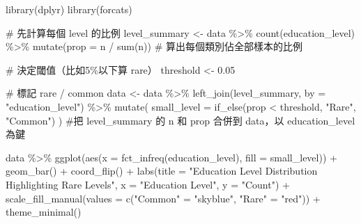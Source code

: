 \documentclass[
  letterpaper,
  DIV=11,
  numbers=noendperiod]{scrartcl}
\newenvironment{Shaded}{\begin{snugshade}}{\end{snugshade}}
\newcommand{\AttributeTok}[1]{\textcolor[rgb]{0.40,0.45,0.13}{#1}}
\newcommand{\CommentTok}[1]{\textcolor[rgb]{0.37,0.37,0.37}{#1}}
\newcommand{\FloatTok}[1]{\textcolor[rgb]{0.68,0.00,0.00}{#1}}
\newcommand{\FunctionTok}[1]{\textcolor[rgb]{0.28,0.35,0.67}{#1}}
\newcommand{\NormalTok}[1]{\textcolor[rgb]{0.00,0.23,0.31}{#1}}
\newcommand{\OtherTok}[1]{\textcolor[rgb]{0.00,0.23,0.31}{#1}}
\newcommand{\SpecialCharTok}[1]{\textcolor[rgb]{0.37,0.37,0.37}{#1}}
\newcommand{\StringTok}[1]{\textcolor[rgb]{0.13,0.47,0.30}{#1}}
\begin{document}
\begin{Shaded}
\begin{Highlighting}[]
\FunctionTok{library}\NormalTok{(dplyr)}
\FunctionTok{library}\NormalTok{(forcats)}

\CommentTok{\# 先計算每個 level 的比例}
\NormalTok{level\_summary }\OtherTok{\textless{}{-}}\NormalTok{ data }\SpecialCharTok{\%\textgreater{}\%}
  \FunctionTok{count}\NormalTok{(education\_level) }\SpecialCharTok{\%\textgreater{}\%}
  \FunctionTok{mutate}\NormalTok{(}\AttributeTok{prop =}\NormalTok{ n }\SpecialCharTok{/} \FunctionTok{sum}\NormalTok{(n))  }\CommentTok{\#  算出每個類別佔全部樣本的比例 }

\CommentTok{\# 決定閾值（比如5\%以下算 rare）}
\NormalTok{threshold }\OtherTok{\textless{}{-}} \FloatTok{0.05}

\CommentTok{\# 標記 rare / common}
\NormalTok{data }\OtherTok{\textless{}{-}}\NormalTok{ data }\SpecialCharTok{\%\textgreater{}\%}
  \FunctionTok{left\_join}\NormalTok{(level\_summary, }\AttributeTok{by =} \StringTok{"education\_level"}\NormalTok{) }\SpecialCharTok{\%\textgreater{}\%}
  \FunctionTok{mutate}\NormalTok{(}
    \AttributeTok{small\_level =} \FunctionTok{if\_else}\NormalTok{(prop }\SpecialCharTok{\textless{}}\NormalTok{ threshold, }\StringTok{"Rare"}\NormalTok{, }\StringTok{"Common"}\NormalTok{)}
\NormalTok{  ) }\CommentTok{\#把 level\_summary 的 n 和 prop 合併到 data，以 education\_level 為鍵}

\NormalTok{data }\SpecialCharTok{\%\textgreater{}\%}
  \FunctionTok{ggplot}\NormalTok{(}\FunctionTok{aes}\NormalTok{(}\AttributeTok{x =} \FunctionTok{fct\_infreq}\NormalTok{(education\_level), }\AttributeTok{fill =}\NormalTok{ small\_level)) }\SpecialCharTok{+}
  \FunctionTok{geom\_bar}\NormalTok{() }\SpecialCharTok{+}
  \FunctionTok{coord\_flip}\NormalTok{() }\SpecialCharTok{+}
  \FunctionTok{labs}\NormalTok{(}\AttributeTok{title =} \StringTok{"Education Level Distribution Highlighting Rare Levels"}\NormalTok{,}
       \AttributeTok{x =} \StringTok{"Education Level"}\NormalTok{,}
       \AttributeTok{y =} \StringTok{"Count"}\NormalTok{) }\SpecialCharTok{+}
  \FunctionTok{scale\_fill\_manual}\NormalTok{(}\AttributeTok{values =} \FunctionTok{c}\NormalTok{(}\StringTok{"Common"} \OtherTok{=} \StringTok{"skyblue"}\NormalTok{, }\StringTok{"Rare"} \OtherTok{=} \StringTok{"red"}\NormalTok{)) }\SpecialCharTok{+}
  \FunctionTok{theme\_minimal}\NormalTok{()}
\end{Highlighting}
\end{Shaded}
\end{document}
